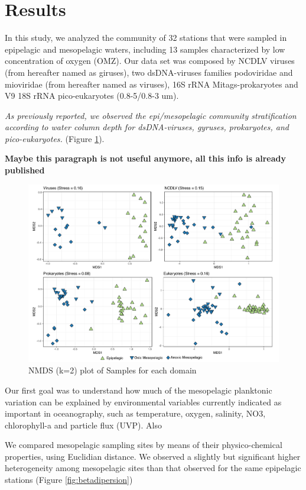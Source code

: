 \documentclass[fleqn,10pt]{wlscirep}
\begin{document}
\section*{Results}

In this study, we analyzed the community of 32 stations that were sampled in epipelagic and mesopelagic waters, including 13 samples characterized by low concentration of oxygen (OMZ). Our data set was composed by NCDLV viruses (from hereafter named as giruses), two dsDNA-viruses families podoviridae and mioviridae (from hereafter named as viruses), 16S rRNA Mitags-prokaryotes and V9 18S rRNA pico-eukaryotes (0.8-5/0.8-3 um).

\textit{As previously reported, we observed the epi/mesopelagic community stratification according to water column depth for dsDNA-viruses, gyruses, prokaryotes, and pico-eukaryotes.}  (Figure \ref{fig:nmds}).


\textbf{Maybe this paragraph is not useful anymore, all this info is already published}


\begin{figure}[ht]
    \centering
    \includegraphics[scale=0.5]{images/nmds_used_SF_to_print.pdf}
    \caption{NMDS (k=2) plot of Samples for each domain}
    \label{fig:nmds}
\end{figure}


Our first goal was to understand how much of the mesopelagic planktonic variation can be explained by environmental variables currently indicated as important in oceanography, such as temperature, oxygen, salinity, NO3, chlorophyll-a and particle flux (UVP). Also 

We compared mesopelagic sampling sites by means of their physico-chemical properties, using Euclidian distance. We observed a slightly but significant higher heterogeneity among mesopelagic sites than that observed for the same epipelagic stations (Figure \ref{fig:betadipersion})
\end{document}
